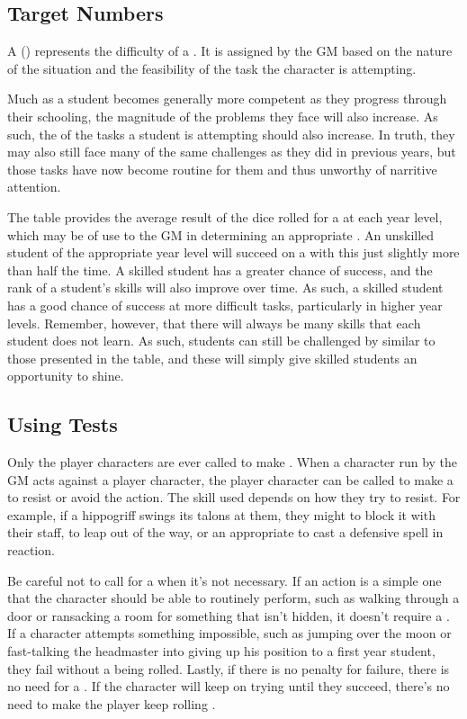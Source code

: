 \subsection{Target Numbers}

A {\targetnumber} ({\tn}) represents the difficulty of a {\test}.
It is assigned by the GM based on the nature of the situation and the feasibility of the task the character is attempting.

Much as a student becomes generally more competent as they progress through their schooling, the magnitude of the problems they face will also increase.
As such, the {\tns} of the tasks a student is attempting should also increase.
In truth, they may also still face many of the same challenges as they did in previous years, but those tasks have now become routine for them and thus unworthy of narritive attention.

The  table provides the average result of the dice rolled for a {\test} at each year level, which may be of use to the GM in determining an appropriate {\tn}.
An unskilled student of the appropriate year level will succeed on a {\test} with this {\tn} just slightly more than half the time.
A skilled student has a greater chance of success, and the rank of a student's skills will also improve over time.
As such, a skilled student has a good chance of success at more difficult tasks, particularly in higher year levels.
Remember, however, that there will always be many skills that each student does not learn.
As such, students can still be challenged by {\tns} similar to those presented in the table, and these will simply give skilled students an opportunity to shine.

\subsection{Using Tests}

Only the player characters are ever called to make {\tests}.
When a character run by the GM acts against a player character, the player character can be called to make a {\test} to resist or avoid the action.
The skill used depends on how they try to resist.
For example, if a hippogriff swings its talons at them, they might {\test}  to block it with their staff, {\test}  to leap out of the way, or {\test} an appropriate {\magicskill} to cast a defensive spell in reaction.

Be careful not to call for a {\test} when it's not necessary.
If an action is a simple one that the character should be able to routinely perform, such as walking through a door or ransacking a room for something that isn't hidden, it doesn't require a {\test}.
If a character attempts something impossible, such as jumping over the moon or fast-talking the headmaster into giving up his position to a first year student, they fail without a {\test} being rolled.
Lastly, if there is no penalty for failure, there is no need for a {\test}.
If the character will keep on trying until they succeed, there's no need to make the player keep rolling {\tests}.
